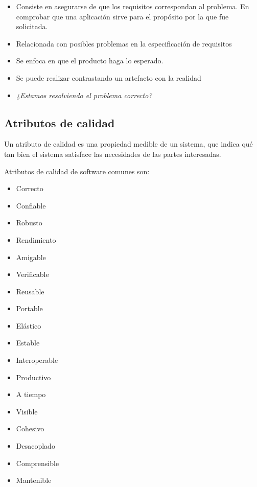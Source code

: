         \begin{itemize}
            \item Consiste en asegurarse de que los requisitos correspondan al problema. En comprobar que una aplicación sirve para el propósito por la que fue solicitada.
            \item Relacionada con posibles problemas en la especificación de requisitos
            \item Se enfoca en que el producto haga lo esperado.
            \item Se puede realizar contrastando un artefacto con la realidad
            \item \textit{¿Estamos resolviendo el problema correcto?}
        \end{itemize}
    
    \subsection*{Atributos de calidad}
    
    Un atributo de calidad es una propiedad medible de un sistema, que indica qué tan bien el sistema satisface las necesidades de las partes interesadas.
    
    Atributos de calidad de software comunes son:
    
    \begin{multicols}{2}
    \begin{itemize}
        \item Correcto
        \item Confiable
        \item Robusto
        \item Rendimiento
        \item Amigable
        \item Verificable
        \item Reusable
        \item Portable
        \item Elástico
        \item Estable
        \item Interoperable
        \item Productivo
        \item A tiempo
        \item Visible
        \item Cohesivo
        \item Desacoplado
        \item Comprensible
        \item Mantenible
    \end{itemize}
    \end{multicols}
    
